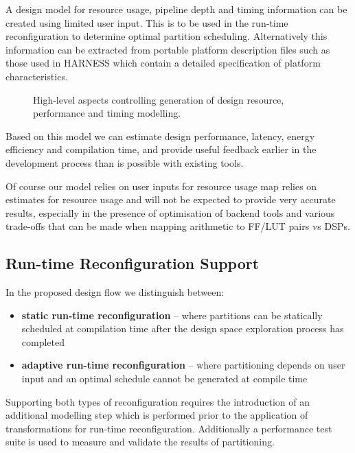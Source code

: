 A design model for resource usage, pipeline depth and timing
information can be created using limited user input. This is to be
used in the run-time reconfiguration to determine optimal partition
scheduling. Alternatively this information can be extracted from
portable platform description files such as those used in HARNESS
which contain a detailed specification of platform characteristics.

\begin{figure}[!ht]
  \centering
  \def\svgwidth{45em}
  
  \caption{High-level aspects controlling generation of design
    resource, performance and timing modelling.}
  \label{fig:reconfig-design-flow}
\end{figure}

Based on this model we can estimate design performance, latency,
energy efficiency and compilation time, and provide useful feedback
earlier in the development process than is possible with existing
tools.

Of course our model relies on user inputs for resource usage map
relies on estimates for resource usage and will not be expected to
provide very accurate results, especially in the presence of
optimisation of backend tools and various trade-offs that can be made
when mapping arithmetic to FF/LUT pairs vs DSPs.

\subsection{Run-time Reconfiguration Support}

In the proposed design flow we distinguish between:
\begin{itemize}
\item \textbf{static run-time reconfiguration} -- where partitions can
  be statically scheduled at compilation time after the design space
  exploration process has completed
\item \textbf{adaptive run-time reconfiguration} -- where partitioning
  depends on user input and an optimal schedule cannot be generated at
  compile time
\end{itemize}

Supporting both types of reconfiguration requires the introduction of
an additional modelling step which is performed prior to the
application of transformations for run-time
reconfiguration. Additionally a performance test suite is used to
measure and validate the results of partitioning.

